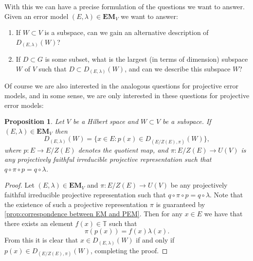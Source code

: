 \documentclass[11pt, oneside, reqno]{amsart}
\newcommand{\bbT}{\mathbb{T}}
\newcommand{\EM}{\mathbf{EM}}
\theoremstyle{definition}
\theoremstyle{plain}
\newtheorem{proposition}[definition]{Proposition}
\theoremstyle{remark}
\begin{document}
With this we can have a precise formulation of the questions we want to answer. Given an error model $(E,\lambda) \in \EM_V$ we want to answer: 
\begin{enumerate}
    \item If $W \subset V$ is a subspace, can we gain an alternative description of $D_{(E,\lambda)}(W)$?
    \item If $D \subset G$ is some subset, what is the largest (in terms of dimension) subspace $W$ of $V$ such that $D \subset D_{(E,\lambda)}(W)$, and can we describe this subspace $W$?
\end{enumerate}
Of course we are also interested in the analogous questions for projective error models, and in some sense, we are only interested in these questions for projective error models:

\begin{proposition}\label{prop:detectable errors of EM vs PEM}
    Let $V$ be a Hilbert space and $W \subset V$ be a subspace. If $(E,\lambda) \in \EM_V$ then
    \begin{equation*}
        D_{(E,\lambda)}(W) = \{ x \in E \colon p(x) \in D_{(E/Z(E),\pi)}(W) \},
    \end{equation*}
    where $p \colon E \to E/Z(E)$ denotes the quotient map, and $\pi \colon E/Z(E) \to U(V)$ is any projectively faithful irreducible projective representation such that $q \circ \pi \circ p = q \circ \lambda$.
\end{proposition}
\begin{proof}
    Let $(E,\lambda) \in \EM_V$ and $\pi \colon E/Z(E) \to U(V)$ be any projectively faithful irreducible projective representation such that $q \circ \pi \circ p = q \circ \lambda$. Note that the existence of such a projective representation $\pi$ is guaranteed by \cref{prop:correspondence between EM and PEM}. Then for any $x \in E$ we have that there exists an element $f(x) \in \bbT$ such that
    \begin{equation*}
        \pi(p(x)) = f(x)\lambda(x).
    \end{equation*}
    From this it is clear that $x \in D_{(E,\lambda)}(W)$ if and only if $p(x) \in D_{(E/Z(E),\pi)}(W)$, completing the proof.
\end{proof}
\end{document}
